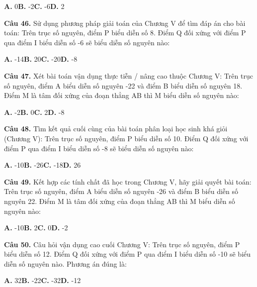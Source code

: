 \documentclass[11pt,a4paper]{article}
\begin{document}
\hspace*{1.5em}\textbf{A.} 0\quad\quad \textbf{B.} -2\quad\quad \textbf{C.} -6\quad\quad \textbf{D.} 2\par\vspace{2pt}
\textbf{\color{primary} Câu 46.} Sử dụng phương pháp giải toán của Chương V để tìm đáp án cho bài toán: Trên trục số nguyên, điểm P biểu diễn số 8. Điểm Q đối xứng với điểm P qua điểm I biểu diễn số -6 sẽ biểu diễn số nguyên nào:\par
\hspace*{1.5em}\textbf{A.} -14\quad\quad \textbf{B.} 20\quad\quad \textbf{C.} -20\quad\quad \textbf{D.} -8\par\vspace{2pt}
\textbf{\color{primary} Câu 47.} Xét bài toán vận dụng thực tiễn / nâng cao thuộc Chương V: Trên trục số nguyên, điểm A biểu diễn số nguyên -22 và điểm B biểu diễn số nguyên 18. Điểm M là tâm đối xứng của đoạn thẳng AB thì M biểu diễn số nguyên nào:\par
\hspace*{1.5em}\textbf{A.} -2\quad\quad \textbf{B.} 0\quad\quad \textbf{C.} 2\quad\quad \textbf{D.} -8\par\vspace{2pt}
\textbf{\color{primary} Câu 48.} Tìm kết quả cuối cùng của bài toán phân loại học sinh khá giỏi (Chương V): Trên trục số nguyên, điểm P biểu diễn số 10. Điểm Q đối xứng với điểm P qua điểm I biểu diễn số -8 sẽ biểu diễn số nguyên nào:\par
\hspace*{1.5em}\textbf{A.} -10\quad\quad \textbf{B.} -26\quad\quad \textbf{C.} -18\quad\quad \textbf{D.} 26\par\vspace{2pt}
\textbf{\color{primary} Câu 49.} Kết hợp các tính chất đã học trong Chương V, hãy giải quyết bài toán: Trên trục số nguyên, điểm A biểu diễn số nguyên -26 và điểm B biểu diễn số nguyên 22. Điểm M là tâm đối xứng của đoạn thẳng AB thì M biểu diễn số nguyên nào:\par
\hspace*{1.5em}\textbf{A.} -10\quad\quad \textbf{B.} 2\quad\quad \textbf{C.} 0\quad\quad \textbf{D.} -2\par\vspace{2pt}
\textbf{\color{primary} Câu 50.} Câu hỏi vận dụng cao cuối Chương V: Trên trục số nguyên, điểm P biểu diễn số 12. Điểm Q đối xứng với điểm P qua điểm I biểu diễn số -10 sẽ biểu diễn số nguyên nào. Phương án đúng là:\par
\hspace*{1.5em}\textbf{A.} 32\quad\quad \textbf{B.} -22\quad\quad \textbf{C.} -32\quad\quad \textbf{D.} -12\par\vspace{2pt}
\end{document}
